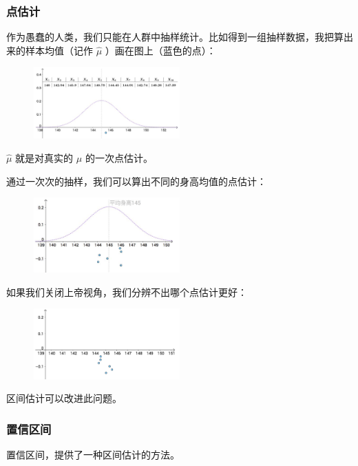 \documentclass[12pt]{article}
\begin{document}
\subsubsection{点估计}
作为愚蠢的人类，我们只能在人群中抽样统计。比如得到一组抽样数据，我把算出来的样本均值（记作 $\hat{\mu}$ ）画在图上（蓝色的点）：
\begin{figure}[H]
    \centering
    \includegraphics[width=0.5\textwidth]{fig/Confidence_Interval_Example_2.png}
\end{figure}

$\hat{\mu}$ 就是对真实的 $\mu$ 的一次点估计。

通过一次次的抽样，我们可以算出不同的身高均值的点估计：
\begin{figure}[H]
    \centering
    \includegraphics[width=0.5\textwidth]{fig/Confidence_Interval_Example_3.png}
\end{figure}

如果我们关闭上帝视角，我们分辨不出哪个点估计更好：
\begin{figure}[H]
    \centering
    \includegraphics[width=0.5\textwidth]{fig/Confidence_Interval_Example_4.png}
\end{figure}
区间估计可以改进此问题。

\subsubsection{置信区间}
置信区间，提供了一种区间估计的方法。
\end{document}
